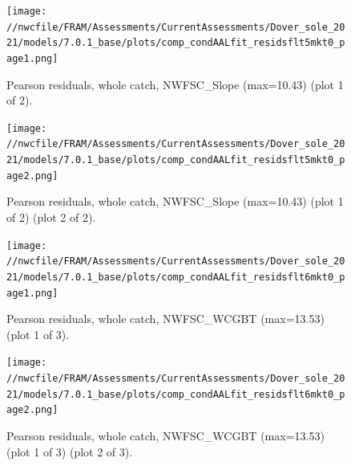 \documentclass[11pt,
  english,
  a4paper,
]{article}
\begin{document}
\leavevmode\tagmcend\tagstructend


\begin{figure}
\centering
\texttt{[image: //nwcfile/FRAM/Assessments/CurrentAssessments/Dover\_sole\_2021/models/7.0.1\_base/plots/comp\_condAALfit\_residsflt5mkt0\_page1.png]}
\caption{Pearson residuals, whole catch, NWFSC\_Slope (max=10.43) (plot 1 of 2).\label{fig:comp_condAALfit_residsflt5mkt0_page1}}
\end{figure}

\tagmcend\tagstructend


\begin{figure}
\centering
\texttt{[image: //nwcfile/FRAM/Assessments/CurrentAssessments/Dover\_sole\_2021/models/7.0.1\_base/plots/comp\_condAALfit\_residsflt5mkt0\_page2.png]}
\caption{Pearson residuals, whole catch, NWFSC\_Slope (max=10.43) (plot 1 of 2) (plot 2 of 2).\label{fig:comp_condAALfit_residsflt5mkt0_page2}}
\end{figure}

\tagmcend\tagstructend


\begin{figure}
\centering
\texttt{[image: //nwcfile/FRAM/Assessments/CurrentAssessments/Dover\_sole\_2021/models/7.0.1\_base/plots/comp\_condAALfit\_residsflt6mkt0\_page1.png]}
\caption{Pearson residuals, whole catch, NWFSC\_WCGBT (max=13.53) (plot 1 of 3).\label{fig:comp_condAALfit_residsflt6mkt0_page1}}
\end{figure}

\tagmcend\tagstructend


\begin{figure}
\centering
\texttt{[image: //nwcfile/FRAM/Assessments/CurrentAssessments/Dover\_sole\_2021/models/7.0.1\_base/plots/comp\_condAALfit\_residsflt6mkt0\_page2.png]}
\caption{Pearson residuals, whole catch, NWFSC\_WCGBT (max=13.53) (plot 1 of 3) (plot 2 of 3).\label{fig:comp_condAALfit_residsflt6mkt0_page2}}
\end{figure}
\end{document}
